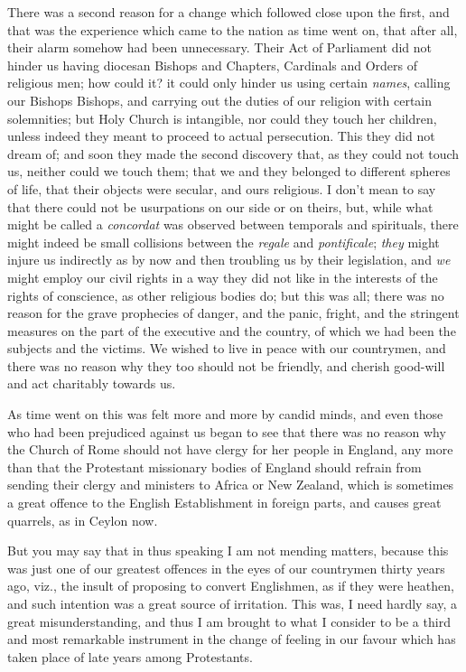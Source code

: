 There was a second reason for a change which followed close upon
the first, and that was the experience which came to the nation as
time went on, that after all, their alarm somehow had been
unnecessary. Their Act of Parliament did not hinder us having diocesan
Bishops and Chapters, Cardinals and Orders of religious men; how could
it? it could only hinder us using certain \emph{names}, calling our
Bishops Bishops, and carrying out the duties of our religion with
certain solemnities; but Holy Church is intangible, nor could they
touch her children, unless indeed they meant to proceed to actual
persecution. This they did not dream of; and soon they made the second
discovery that, as they could not touch us, neither could we
touch them; that we and they belonged to different spheres of life,
that their objects were secular, and ours religious. I don't mean to
say that there could not be usurpations on our side or on theirs, but,
while what might be called a \emph{concordat} was observed between
temporals and spirituals, there might indeed be small collisions
between the \emph{regale} and \emph{pontificale}; \emph{they} might
injure us indirectly as by now and then troubling us by their
legislation, and \emph{we} might employ our civil rights in a way they
did not like in the interests of the rights of conscience, as other
religious bodies do; but this was all; there was no reason for the
grave prophecies of danger, and the panic, fright, and the stringent
measures on the part of the executive and the country, of which we had
been the subjects and the victims. We wished to live in peace with our
countrymen, and there was no reason why they too should not be
friendly, and cherish good-will and act charitably towards us.

As time went on this was felt more and more by candid minds, and
even those who had been prejudiced against us began to see that there
was no reason why the Church of Rome should not have clergy for her
people in England, any more than that the Protestant missionary bodies
of England should refrain from sending their clergy and ministers to
Africa or New Zealand, which is sometimes a great offence to the
English Establishment in foreign parts, and causes great quarrels, as
in Ceylon now.

But you may say that in thus speaking I am not mending matters,
because this was just one of our greatest offences in the eyes of our
countrymen thirty years ago, viz., the insult of proposing to convert
Englishmen, as if they were heathen, and such intention was a great
source of irritation. This was, I need hardly say, a great
misunderstanding, and thus I am brought to what I consider to be a
third and most remarkable instrument in the change of feeling in our
favour which has taken place of late years among Protestants.

